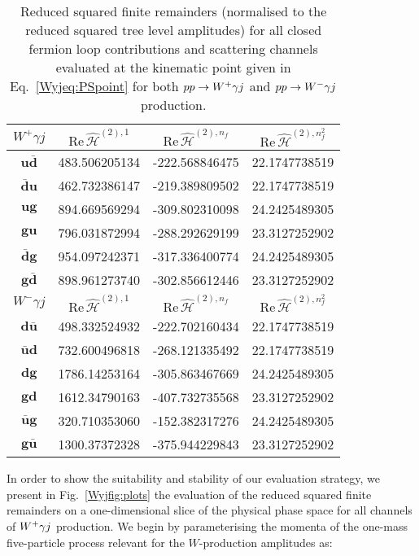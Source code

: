 \documentclass[main.tex]{subfiles}
\begin{document}
\begin{table}[t!]
\centering
\begin{tabularx}{1.0\textwidth}{|C{0.4}|C{1.2}|C{1.2}|C{1.2}|}
\hline
$W^+ \gamma j $ & $\mathrm{Re}\,\hat{\mathcal{H}}^{(2),1}$ & $\mathrm{Re}\,\hat{\mathcal{H}}^{(2),n_f}$ & $\mathrm{Re}\,\hat{\mathcal{H}}^{(2),n_f^2}$ \\
\hline
$\mathbf{u\bar{d}}$  & 483.506205134 & -222.568846475 & 22.1747738519  \\
$\mathbf{\bar{d}u}$  & 462.732386147 & -219.389809502 & 22.1747738519  \\
$\mathbf{ug}      $  & 894.669569294 & -309.802310098 & 24.2425489305  \\
$\mathbf{gu}      $  & 796.031872994 & -288.292629199 & 23.3127252902  \\
$\mathbf{\bar{d}g}$  & 954.097242371 & -317.336400774 & 24.2425489305  \\
$\mathbf{g\bar{d}}$  & 898.961273740 & -302.856612446 & 23.3127252902  \\
\hline
\hline
$W^- \gamma j $ & $\mathrm{Re}\,\hat{\mathcal{H}}^{(2),1}$ & $\mathrm{Re}\,\hat{\mathcal{H}}^{(2),n_f}$ & $\mathrm{Re}\,\hat{\mathcal{H}}^{(2),n_f^2}$ \\
\hline
$\mathbf{d\bar{u}}$  & 498.332524932 & -222.702160434 & 22.1747738519  \\ 
$\mathbf{\bar{u}d}$  & 732.600496818 & -268.121335492 & 22.1747738519  \\
$\mathbf{dg}      $  & 1786.14253164 & -305.863467669 & 24.2425489305  \\
$\mathbf{gd}      $  & 1612.34790163 & -407.732735568 & 23.3127252902  \\
$\mathbf{\bar{u}g}$  & 320.710353060 & -152.382317276 & 24.2425489305  \\
$\mathbf{g\bar{u}}$  & 1300.37372328 & -375.944229843 & 23.3127252902  \\
\hline
\end{tabularx}
\caption{\label{Wyjtab:benchmarkfinremsq2L} 
Reduced squared finite remainders (normalised to the reduced squared tree level amplitudes) for all closed fermion loop contributions and scattering channels
evaluated at the kinematic point given in Eq.~\ref{Wyjeq:PSpoint} for both $pp\to W^+\gamma j$ and $pp\to W^-\gamma j$ production.
}
\end{table}
In order to show the suitability and stability of our evaluation strategy, we present in Fig.~\ref{Wyjfig:plots} the evaluation of the reduced squared finite remainders on a one-dimensional slice of the physical phase space for all channels of $W^+\gamma j$ production. We begin by parameterising the momenta of the one-mass five-particle process relevant for the $W$-production amplitudes as:
\end{document}
